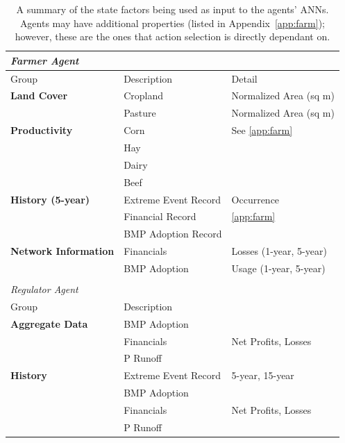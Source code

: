 \begin{table}
    \centering
    \caption{A summary of the state factors being used as input to the
    agents' ANNs. Agents may have additional properties
    (listed in Appendix~\ref{app:farm}); 
    however, these are the ones that action selection 
    is directly dependant on.}
    \label{tab:farm_agents_states}
    \begin{tabularx}{\linewidth}{XXl}
        \emph{Farmer Agent} \\
        \hline\hline
        Group & Description & Detail \\
        \hline
        \textbf{Land Cover} & Cropland & Normalized Area (sq m) \\
        & Pasture & Normalized Area (sq m) \\
        \textbf{Productivity} & Corn & See \ref{app:farm} \\
        & Hay \\
        & Dairy \\
        & Beef \\
        \textbf{History (5-year)} & Extreme Event Record & Occurrence \\
        & Financial Record & \ref{app:farm} \\
        & BMP Adoption Record & \\
        \textbf{Network Information} & Financials & Losses (1-year, 5-year) \\
        & BMP Adoption & Usage (1-year, 5-year) \\
        \hline \\[1.0em]
        \emph{Regulator Agent} \\
        \hline
        \hline
        Group & Description & \\
        \hline
        \textbf{Aggregate Data} & \multicolumn{2}{l}{BMP Adoption} \\
        & Financials & Net Profits, Losses \\
        & \multicolumn{2}{l}{P Runoff} \\
        \textbf{History} & Extreme Event Record & 5-year, 15-year \\
        & \multicolumn{2}{l}{BMP Adoption} \\
        & Financials & Net Profits, Losses \\
        & \multicolumn{2}{l}{P Runoff} \\
        \hline
    \end{tabularx}
\end{table}

